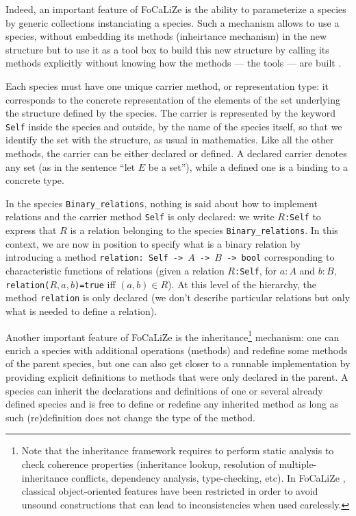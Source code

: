 \documentclass[submission,copyright,creativecommons]{eptcs}
\def\focalize{FoCaLiZe \mbox{}}
\begin{document}
Indeed,
an important feature of \focalize is the ability to
parameterize a species by generic collections instanciating a species. Such a
mechanism allows to use a species, 
without embedding its methods (inheirtance mechanism) in the new
structure but to use it as a tool box to build this new structure  
by calling its methods
explicitly  without knowing how the methods --- the tools --- are built . 


Each species must have one unique carrier method, or representation
type: it corresponds to
the concrete representation of
the elements of the set underlying the structure defined
by the species. 
The carrier is represented by the keyword {\footnotesize \tt Self} inside
the species and outside, by the name of the species itself, so that we
identify the
set with the structure, as usual in mathematics.
Like all the other methods, the carrier
can be either declared or defined. A declared carrier 
denotes any set (as in the sentence ``let $E$ be a set''), 
while a defined one is a binding to a concrete type. 

In the species {\footnotesize \tt Binary\_relations}, nothing is said about
how to implement relations and the carrier method {\footnotesize \tt Self} is only
declared: we write {\footnotesize \tt $R$:Self} to express that $R$ is a
relation belonging to the species
{\footnotesize \tt Binary\_relations}. In this context, we are now in
position to specify what is a binary relation by introducing a method
{\footnotesize \tt relation: Self -> $A$ -> $B$ -> bool}
corresponding to characteristic
functions of relations (given a relation {\footnotesize \tt $R$:Self}, for
$a:A$ and $b:B$, 
{\footnotesize \tt relation($R,a,b$)=true} iff  $(a,b) \in R$). At this level of the hierarchy,
the method {\footnotesize \tt relation} is only declared (we don't describe 
particular relations but only what is needed to define a relation).

Another important feature of \focalize is the
inheritance\footnote{Note that the 
inheritance framework requires to perform static analysis
to check coherence properties (inheritance lookup, resolution of 
multiple-inheritance conflicts, dependency analysis, type-checking,
etc).
In \focalize, classical object-oriented features have been restricted
in order to
avoid unsound constructions that can lead to inconsistencies when used
carelessly.}
mechanism: one can
enrich a species with additional operations (methods) and
redefine some methods of the parent species, but one can also get
closer to a runnable implementation by providing explicit definitions to methods
that were only declared in the parent.
A species can
inherit the declarations and definitions of one or several already
defined species and is
free to define or
redefine any inherited method as long as such (re)definition does not
change the type of the method.
\end{document}
